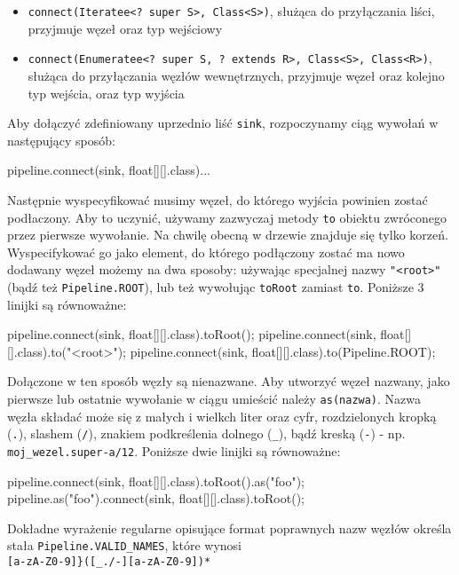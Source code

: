 \begin{itemize}
  \item \texttt{connect(Iteratee<? super S>, Class<S>)}, służąca do przyłączania liści, przyjmuje
    węzeł oraz typ wejściowy

  \item \texttt{connect(Enumeratee<? super S, ? extends R>, Class<S>, Class<R>)}, służąca do
    przyłączania węzłów wewnętrznych, przyjmuje węzeł oraz kolejno typ wejścia, oraz typ wyjścia
\end{itemize}

Aby dołączyć zdefiniowany uprzednio liść \texttt{sink}, rozpoczynamy ciąg wywołań w następujący
sposób:

\begin{java}
pipeline.connect(sink, float[][].class)...
\end{java}

Następnie wyspecyfikować musimy węzeł, do którego wyjścia powinien zostać podłaczony. Aby to
uczynić, używamy zazwyczaj metody \texttt{to} obiektu zwróconego przez pierwsze wywołanie. Na chwilę
obecną w drzewie znajduje się tylko korzeń. Wyspecifykować go jako element, do którego podłączony
zostać ma nowo dodawany węzeł możemy na dwa sposoby: używając specjalnej nazwy \texttt{"<root>"}
(bądź też \texttt{Pipeline.ROOT}), lub też wywołując \texttt{toRoot} zamiast \texttt{to}. Poniższe 3
linijki są równoważne:

\begin{java}
pipeline.connect(sink, float[][].class).toRoot();
pipeline.connect(sink, float[][].class).to("<root>");
pipeline.connect(sink, float[][].class).to(Pipeline.ROOT);
\end{java}

Dołączone w ten sposób węzły są nienazwane. Aby utworzyć węzeł nazwany, jako pierwsze lub ostatnie
wywołanie w ciągu umieścić należy \texttt{as(nazwa)}. Nazwa węzła składać może się z małych i
wielkch liter oraz cyfr, rozdzielonych kropką (\texttt{.}), slashem (\texttt{/}), znakiem
podkreślenia dolnego (\texttt{\_}), bądź kreską (\texttt{-}) - np. \texttt{moj\_wezel.super-a/12}.
Poniższe dwie linijki są równoważne:

\begin{java}
pipeline.connect(sink, float[][].class).toRoot().as("foo");
pipeline.as("foo").connect(sink, float[][].class).toRoot();
\end{java}

\begin{Note}
Dokładne wyrażenie regularne opisujące format poprawnych nazw węzłów określa stała
\texttt{Pipeline.VALID\_NAMES}, które wynosi \\
\texttt{[a-zA-Z0-9]\}([\_./-][a-zA-Z0-9])*}
\end{Note}

